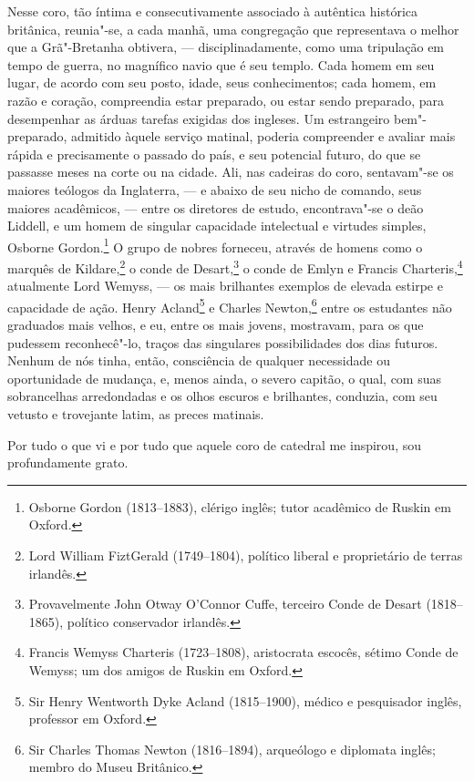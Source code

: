 Nesse coro, tão íntima e consecutivamente associado à autêntica
histórica britânica, reunia"-se, a cada manhã, uma congregação que
representava o melhor que a Grã"-Bretanha obtivera, --- disciplinadamente,
como uma tripulação em tempo de guerra, no magnífico navio que é seu
templo. Cada homem em seu lugar, de acordo com seu posto, idade, seus
conhecimentos; cada homem, em razão e coração, compreendia estar
preparado, ou estar sendo preparado, para desempenhar as árduas tarefas
exigidas dos ingleses. Um estrangeiro bem"-preparado, admitido àquele
serviço matinal, poderia compreender e avaliar mais rápida e
precisamente o passado do país, e seu potencial futuro, do que se
passasse meses na corte ou na cidade. Ali, nas cadeiras do coro,
sentavam"-se os maiores teólogos da Inglaterra, --- e abaixo de seu nicho
de comando, seus maiores acadêmicos, --- entre os diretores de estudo,
encontrava"-se o deão Liddell, e um homem de singular capacidade
intelectual e virtudes simples, Osborne Gordon.\footnote{Osborne Gordon
  (1813--1883), clérigo inglês; tutor acadêmico de Ruskin em Oxford.} O grupo de nobres forneceu, através de homens como o
marquês de Kildare,\footnote{Lord William FiztGerald (1749--1804),
  político liberal e proprietário de terras irlandês.} o
conde de Desart,\footnote{Provavelmente John Otway O'Connor Cuffe, terceiro
  Conde de Desart (1818--1865), político conservador irlandês.} o conde de Emlyn e Francis Charteris,\footnote{Francis Wemyss
  Charteris (1723--1808), aristocrata escocês, sétimo Conde de Wemyss; um dos
  amigos de Ruskin em Oxford.} atualmente Lord Wemyss,
--- os mais brilhantes exemplos de elevada estirpe e capacidade de ação.
Henry Acland\footnote{Sir Henry Wentworth Dyke Acland (1815--1900),
  médico e pesquisador inglês, professor em Oxford.} e
Charles Newton,\footnote{Sir Charles Thomas Newton (1816--1894),
  arqueólogo e diplomata inglês; membro do Museu Britânico.} entre os estudantes não graduados mais velhos, e eu, entre os
mais jovens, mostravam, para os que pudessem reconhecê"-lo, traços das
singulares possibilidades dos dias futuros. Nenhum de nós tinha, então,
consciência de qualquer necessidade ou oportunidade de mudança, e, menos
ainda, o severo capitão, o qual, com suas sobrancelhas arredondadas e os
olhos escuros e brilhantes, conduzia, com seu vetusto e trovejante
latim, as preces matinais.

Por tudo o que vi e por tudo que aquele coro de catedral me inspirou,
sou profundamente grato.

